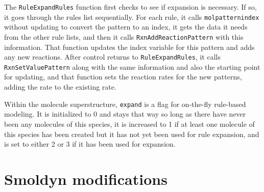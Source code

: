 \documentclass {book}
\begin{document}
The \texttt{RuleExpandRules} function first checks to see if expansion is necessary. If so, it goes through the rules list sequentially. For each rule, it calls \texttt{molpatternindex} without updating to convert the pattern to an index, it gets the data it needs from the other rule lists, and then it calls \texttt{RxnAddReactionPattern} with this information. That function updates the index variable for this pattern and adds any new reactions. After control returns to \texttt{RuleExpandRules}, it calls \texttt{RxnSetValuePattern} along with the same information and also the starting point for updating, and that function sets the reaction rates for the new patterns, adding the rate to the existing rate.

Within the molecule superstructure, \texttt{expand} is a flag for on-the-fly rule-based modeling. It is initialized to 0 and stays that way so long as there have never been any molecules of this species, it is increased to 1 if at least one molecule of this species has been created but it has not yet been used for rule expansion, and is set to either 2 or 3 if it has been used for expansion.


\chapter{Smoldyn modifications}

\renewcommand{\labelitemi}{$\cdot$}
\end{document}
